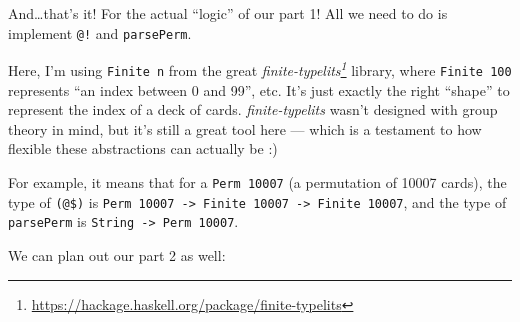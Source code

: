 \documentclass[]{article}
\newenvironment{Shaded}{}{}
\newcommand{\CommentTok}[1]{\textcolor[rgb]{0.38,0.63,0.69}{\textit{#1}}}
\newcommand{\DataTypeTok}[1]{\textcolor[rgb]{0.56,0.13,0.00}{#1}}
\newcommand{\DecValTok}[1]{\textcolor[rgb]{0.25,0.63,0.44}{#1}}
\newcommand{\FunctionTok}[1]{\textcolor[rgb]{0.02,0.16,0.49}{#1}}
\newcommand{\KeywordTok}[1]{\textcolor[rgb]{0.00,0.44,0.13}{\textbf{#1}}}
\newcommand{\NormalTok}[1]{#1}
\newcommand{\OperatorTok}[1]{\textcolor[rgb]{0.40,0.40,0.40}{#1}}
\newcommand{\OtherTok}[1]{\textcolor[rgb]{0.00,0.44,0.13}{#1}}
\renewcommand{\href}[2]{#2\footnote{\url{#1}}}
\begin{document}
\begin{Shaded}
\end{Shaded}

And\ldots that's it! For the actual ``logic'' of our part 1! All we need to do
is implement \texttt{@!} and \texttt{parsePerm}.

Here, I'm using \texttt{Finite\ n} from the great
\emph{\href{https://hackage.haskell.org/package/finite-typelits}{finite-typelits}}
library, where \texttt{Finite\ 100} represents ``an index between 0 and 99'',
etc. It's just exactly the right ``shape'' to represent the index of a deck of
cards. \emph{finite-typelits} wasn't designed with group theory in mind, but
it's still a great tool here --- which is a testament to how flexible these
abstractions can actually be :)

For example, it means that for a \texttt{Perm\ 10007} (a permutation of 10007
cards), the type of \texttt{(@\$)} is
\texttt{Perm\ 10007\ -\textgreater{}\ Finite\ 10007\ -\textgreater{}\ Finite\ 10007},
and the type of \texttt{parsePerm} is
\texttt{String\ -\textgreater{}\ Perm\ 10007}.

We can plan out our part 2 as well:

\begin{Shaded}
\end{Shaded}
\end{document}

